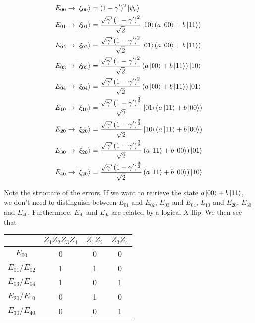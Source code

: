 \documentclass[twoside]{article}
\begin{document}
\begin{align}
E_{00} &\rightarrow \Ket{\xi_{00}}  = (1-\gamma')^2\Ket{\psi_c}\\
E_{01} &\rightarrow \Ket{\xi_{01}} =\frac{\sqrt{\gamma'}\left(1-\gamma'\right)^2}{\sqrt{2}}\Ket{10}\left(a\Ket{00}+b\Ket{11}\right)\\
E_{02} &\rightarrow \Ket{\xi_{02}} =\frac{\sqrt{\gamma'}\left(1-\gamma'\right)^2}{\sqrt{2}}\Ket{01}\left(a\Ket{00}+b\Ket{11}\right)\\
E_{03} &\rightarrow \Ket{\xi_{03}} =\frac{\sqrt{\gamma'}\left(1-\gamma'\right)^2}{\sqrt{2}}\left(a\Ket{00}+b\Ket{11}\right)\Ket{10}\\
E_{04} &\rightarrow \Ket{\xi_{04}} =\frac{\sqrt{\gamma'}\left(1-\gamma'\right)^2}{\sqrt{2}}\left(a\Ket{00}+b\Ket{11}\right)\Ket{01}\\
E_{10} &\rightarrow \Ket{\xi_{10}} =\frac{\sqrt{\gamma'}\left(1-\gamma'\right)^{\frac{3}{2}}}{\sqrt{2}}\Ket{01}\left(a\Ket{11}+b\Ket{00}\right)\\
E_{20} &\rightarrow \Ket{\xi_{20}} =\frac{\sqrt{\gamma'}\left(1-\gamma'\right)^{\frac{3}{2}}}{\sqrt{2}}\Ket{10}\left(a\Ket{11}+b\Ket{00}\right)\\
E_{30} &\rightarrow \Ket{\xi_{20}} =\frac{\sqrt{\gamma'}\left(1-\gamma'\right)^{\frac{3}{2}}}{\sqrt{2}}\left(a\Ket{11}+b\Ket{00}\right)\Ket{01}\\
E_{40} &\rightarrow \Ket{\xi_{20}} =\frac{\sqrt{\gamma'}\left(1-\gamma'\right)^{\frac{3}{2}}}{\sqrt{2}}\left(a\Ket{11}+b\Ket{00}\right)\Ket{10}\\
\end{align}

Note the structure of the errors. If we want to retrieve the state $a\Ket{00}+b\Ket{11}$, we don't need to distinguish between $E_{01}$ and $E_{02}$, $E_{03}$ and $E_{04}$, $E_{10}$ and $E_{20}$, $E_{30}$ and $E_{40}$. Furthermore, $E_{i0}$ and $E_{0i}$ are related by a logical $X$-flip. We then see that


\begin{center}
  \begin{tabular}{  c | c  c  c}
& $Z_1Z_2Z_3Z_4$ & $Z_1Z_2$ & $Z_3Z_4$\\
    \hline
$E_{00}$ &  0 & 0 & 0 \\
$E_{01}/E_{02}$ &  1 & 1 & 0 \\
$E_{03}/E_{04}$ &  1 & 0 & 1 \\
$E_{20}/E_{10}$ &  0 & 1 & 0 \\
$E_{30}/E_{40}$ &  0 & 0 & 1 \\
  \end{tabular}
\end{center}
\end{document}
